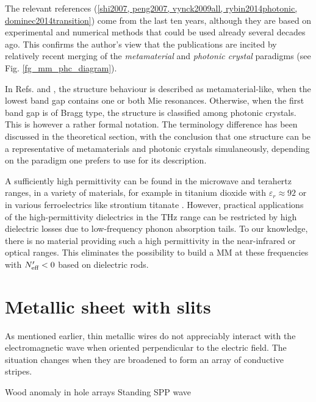 The relevant references (\ref{shi2007, peng2007, vynck2009all, rybin2014photonic, dominec2014transition}) come from the last ten years, although they are based on experimental and numerical methods that could be used already several decades ago. This confirms the author's view that the publications are incited by relatively recent merging of the \textit{metamaterial} and \textit{photonic crystal} paradigms (see Fig. \ref{fg_mm_phc_diagram}).

In Refs.  \cite{rybin2014photonic} and \cite{dominec2014transition}, the structure behaviour is described as metamaterial-like, when the lowest band gap contains one or both Mie resonances. Otherwise, when the first band gap is of Bragg type, the structure is classified among photonic crystals. This is however a rather formal notation. The terminology difference has been discussed in the theoretical section, with the conclusion that one structure can be a representative of metamaterials and photonic crystals simulaneously, depending on the paradigm one prefers to use for its description. 

A sufficiently high permittivity can be found in the microwave and terahertz ranges, in a variety of materials, for example in titanium dioxide with $\varepsilon_r \approx 92$ \cite{nemec2009tunable} or in various ferroelectrics like strontium titanate \cite{skoromets2011tuning}. However, practical applications of the high-permittivity dielectrics in the THz range can be restricted by high dielectric losses due to low-frequency phonon absorption tails. To our knowledge, there is no material providing such a high permittivity in the near-infrared or optical ranges. This eliminates the possibility to build a MM at these frequencies with $N_{\text{eff} }'<0$ based on dielectric rods.

\FloatBarrier %

\section{Metallic sheet with slits} \label{section_eot}
As mentioned earlier, thin metallic wires do not appreciably interact with the electromagnetic wave when oriented perpendicular to the electric field. The situation changes when they are broadened to form an array of conductive stripes.


Wood anomaly in hole arrays
Standing SPP wave

